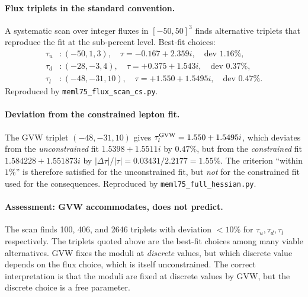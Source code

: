 \documentclass[12pt,a4paper]{article}
\numberwithin{equation}{section}
\begin{document}
\paragraph{Flux triplets in the standard convention.}
A systematic scan over integer fluxes in \([-50,50]^3\) finds
alternative triplets that reproduce the fit at the sub-percent
level. Best-fit choices:
\begin{equation}
\begin{aligned}
\tau_u &: (-50,1,3), \quad \tau = -0.167+2.359i, \quad \text{dev } 1.16\%, \\
\tau_d &: (-28,-3,4), \quad \tau = +0.375+1.543i, \quad \text{dev } 0.37\%, \\
\tau_l &: (-48,-31,10), \quad \tau = +1.550+1.5495i, \quad \text{dev } 0.47\%.
\end{aligned}
\end{equation}
Reproduced by \texttt{meml75\_flux\_scan\_cs.py}.

\paragraph{Deviation from the constrained lepton fit.}
The GVW triplet \((-48,-31,10)\) gives \(\tau_l^{\rm GVW} = 1.550 + 1.5495i\),
which deviates from the \emph{unconstrained} fit
\(1.5398 + 1.5511i\) by \(0.47\%\), but from the \emph{constrained}
fit \(1.584228 + 1.551873i\) by
\(|\Delta\tau|/|\tau| = 0.03431/2.2177 = \mathbf{1.55\%}\).
The criterion ``within \(1\%\)'' is therefore satisfied for the
unconstrained fit, but \emph{not} for the constrained fit used for
the consequences. Reproduced by \texttt{meml75\_full\_hessian.py}.

\paragraph{Assessment: GVW accommodates, does not predict.}
The scan finds 100, 406, and 2646 triplets with deviation \(<10\%\)
for \(\tau_u, \tau_d, \tau_l\) respectively. The triplets quoted
above are the best-fit choices among many viable alternatives. GVW
fixes the moduli at \emph{discrete} values, but which discrete value
depends on the flux choice, which is itself unconstrained. The
correct interpretation is that the moduli are fixed at discrete
values by GVW, but the discrete choice is a free parameter.
\end{document}
